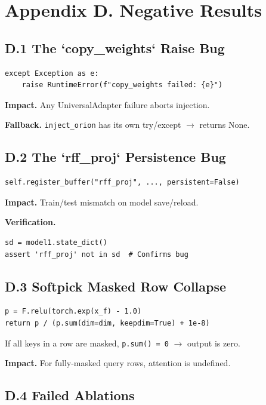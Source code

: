 
\section{Appendix D. Negative Results}

\subsection{D.1 The `copy\_weights` Raise Bug}

\begin{lstlisting}
except Exception as e:
    raise RuntimeError(f"copy_weights failed: {e}")
\end{lstlisting}

\textbf{Impact.} Any UniversalAdapter failure aborts injection.

\textbf{Fallback.} \texttt{inject\_orion} has its own try/except $\to$ returns None.

\subsection{D.2 The `rff\_proj` Persistence Bug}

\begin{lstlisting}
self.register_buffer("rff_proj", ..., persistent=False)
\end{lstlisting}

\textbf{Impact.} Train/test mismatch on model save/reload.

\textbf{Verification.}

\begin{lstlisting}
sd = model1.state_dict()
assert 'rff_proj' not in sd  # Confirms bug
\end{lstlisting}

\subsection{D.3 Softpick Masked Row Collapse}

\begin{lstlisting}
p = F.relu(torch.exp(x_f) - 1.0)
return p / (p.sum(dim=dim, keepdim=True) + 1e-8)
\end{lstlisting}

If all keys in a row are masked, \texttt{p.sum() = 0} $\to$ output is zero.

\textbf{Impact.} For fully-masked query rows, attention is undefined.

\subsection{D.4 Failed Ablations}

